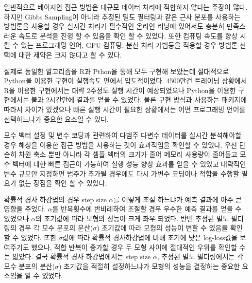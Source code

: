 \documentclass[oneside,b5paper,11pt]{book} %
\begin{document}
일반적으로 베이지안 접근 방법은 대규모 데이터 처리에 적합하지 않다는 주장이 많다. 하지만 Gibbs Sampling이 아니라 추정된 밀도 필터링과 같은 근사 분포를 사용하는 방법론을 사용할 경우 실시간 처리가 필수적인 온라인 러닝에 있어서도 충분히 만족스러운 속도로 분석을 진행 할 수 있음을 확인 할 수 있었다. 또한 컴퓨팅 속도를 향상 시킬 수 있는 프로그래밍 언어, GPU 컴퓨팅, 분산 처리 기법등을 적용할 경우 방법론 선택에 대한 제약은 크지 않다고 할 수 있다.

실제로 동일한 알고리즘을 R과 Pthon을 통해 모두 구현해 보았는데 절대적으로 Python을 이용한 구현이 실행속도 면에서 압도적이었다. 4500만건 트레이닝 상황에서 R을 이용한 구현에서는 대략 2주정도 실행 시간이 예상되었으나 Python을 이용한 구현에서는 불과 2시간만에 결과를 얻을 수 있었다. 물론 구현 방식과 사용하는 패키지에 따라서 차이가 있겠으나 빠른 실행 시간이 필요한 상황에서는 어떤 프로그래밍 언어를 선택하느냐가 중요한 요소일 수 있다.

모수 벡터 설정 및 변수 코딩과 관련하여 다범주 다변수 데이터를 실시간 분석해야할 경우 해싱을 이용한 접근 방법을 사용하는 것이 효과적임을 확인할 수 있었다. 우선 단순히 차원 축소 뿐만 아니라 각 셈플 벡터의 크기가 줄어 메모리 사용량이 줄어들고 모수 벡터에 대한 빠른 접근이 가능하여 실행 성능 향상 효과를 얻을 수 있었고 대략적인 변수 규모만 지정하면 범주가 추가될 경우에도 다시 가변수 코딩이나 적합을 수행할 필요가 없는 장점을 확인 할 수 있었다.

 확률적 경사 하강법의 경우 step size $\alpha$를 어떻게 조절 하느냐가 예측 결과에 아주 큰 영향을 주었다. $\alpha$를 반복횟수에 반비례하여 조절할 경우 우수한 예측 결과를 얻을 수 있었으나 $\alpha$의 초기값에 따라 모형의 성능이 크게 좌우 되었다. 반면 추정된 밀도 필터링의 경우 각 모수 분포의 분산($\sigma$) 초기값에 따라 모형의 성능이 변할 수 있음을 확인 할 수 있었다. 또한 $\sigma$값에 따라 확률적 경사하강법에 비해 초기에 낮은 log-loss값을 보여주기도 했으나, 적합 반복이 증가할 경우 두 모형 사이에 절대적인 우위를 확인할 수는 없았다. 결국 확률적 경사 하강법에서는 step size $\alpha$, 추정된 밀도 필터링에서는 각 모수 분포의 분산($\sigma$) 초기값을 적절히 설정하느냐가 모형의 성능을 결정하는 중요한 요소임을 알 수 있었다.














%
%


\end{document}
